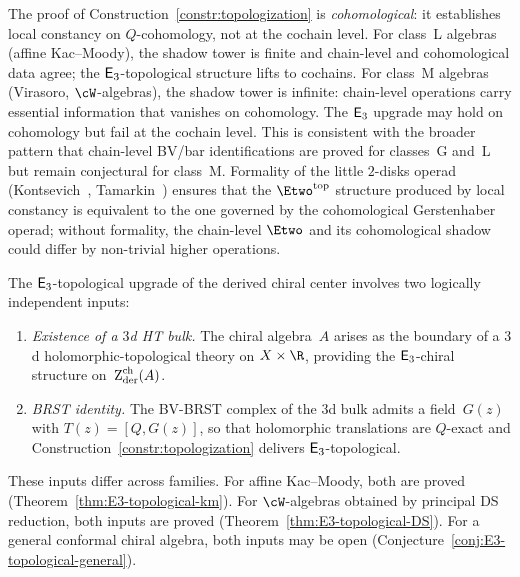 \begin{remark}
\label{rem:cohomological-vs-cochain}
The proof of Construction~\ref{constr:topologization} is
\emph{cohomological}: it establishes local constancy on
$Q$-cohomology, not at the cochain level.
For class~L algebras (affine Kac--Moody), the
shadow tower is finite and chain-level and cohomological
data agree; the $\mathsf{E}_3$-topological structure lifts to
cochains.
For class~M algebras (Virasoro, $\cW$-algebras), the
shadow tower is infinite: chain-level operations carry
essential information that vanishes on cohomology.
The $\mathsf{E}_3$ upgrade may hold on cohomology but fail at the
cochain level. This is consistent with the broader pattern
that chain-level BV/bar identifications are proved for
classes~G and~L but remain conjectural for class~M.
Formality of the little $2$-disks operad
(Kontsevich~\cite{Kon03}, Tamarkin~\cite{Tamarkin00})
ensures that the $\Etwo^{\mathrm{top}}$ structure produced
by local constancy is equivalent to the one governed
by the cohomological Gerstenhaber operad; without formality,
the chain-level $\Etwo$ and its cohomological shadow could
differ by non-trivial higher operations.
\end{remark}

\label{conj:E3-topological-climax}

\begin{remark}
\label{rem:E3-topological-separation}
The $\mathsf{E}_3$-topological upgrade of the derived chiral center
involves two logically independent inputs:
\begin{enumerate}[label=\textup{(\alph*)}]
\item\label{item:E3-existence}
 \emph{Existence of a $3$d HT bulk.}
 The chiral algebra~$A$ arises as the boundary of a $3$d
 holomorphic-topological theory on $X \times \R$, providing
 the $\mathsf{E}_3$-chiral structure on~$\operatorname{Z}_{\mathrm{der}}^{\mathrm{ch}}(A)$.
\item\label{item:E3-brst}
 \emph{BRST identity.}
 The BV-BRST complex of the $3$d bulk admits a field~$G(z)$
 with $T(z) = [Q, G(z)]$, so that holomorphic translations
 are $Q$-exact and
 Construction~\textup{\ref{constr:topologization}} delivers
 $\mathsf{E}_3$-topological.
\end{enumerate}
These inputs differ across families.
For affine Kac--Moody, both are proved
\textup{(}Theorem~\textup{\ref{thm:E3-topological-km}}\textup{)}.
For $\cW$-algebras obtained by principal DS reduction, both inputs
are proved
\textup{(}Theorem~\textup{\ref{thm:E3-topological-DS}}\textup{)}.
For a general conformal chiral algebra, both inputs may be open
\textup{(}Conjecture~\textup{\ref{conj:E3-topological-general}}\textup{)}.
\end{remark}

